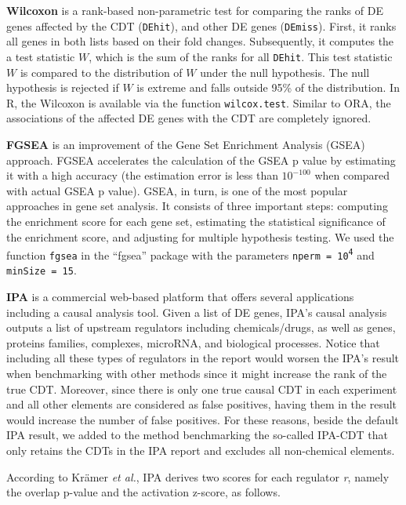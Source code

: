 \textbf{Wilcoxon} is a rank-based non-parametric test for comparing the ranks of DE genes affected by the CDT (\texttt{DEhit}), and other DE genes (\texttt{DEmiss}). First, it ranks all genes in both lists based on their fold changes. Subsequently, it computes the a test statistic $W$, which is the sum of the ranks for all \texttt{DEhit}. This test statistic $W$ is compared to the distribution of $W$ under the null hypothesis. The null hypothesis is rejected if $W$ is extreme and falls outside 95\% of the distribution. In R, the Wilcoxon is available via the function \texttt{wilcox.test}.  Similar to ORA, the  associations of the affected DE genes with the CDT are completely ignored.

\textbf{FGSEA} is an improvement of the Gene Set Enrichment Analysis (GSEA) approach. FGSEA accelerates the calculation of the GSEA p value by estimating it with a high accuracy (the estimation error is less than $10^{-100}$ when compared with actual GSEA p value). GSEA, in turn, is one of the most popular approaches in gene set analysis\cite{Subramanian:2005}. It consists of three important steps: computing the enrichment score for each gene set, estimating the statistical significance of the enrichment score, and adjusting for multiple hypothesis testing. We used the function \texttt{fgsea} in the ``fgsea'' package with the parameters \texttt{nperm = 10\textsuperscript{4}} and \texttt{minSize = 15}.

\textbf{IPA} is a commercial web-based platform that offers several applications including a causal analysis tool\cite{kramer2013causal}. Given a list of DE genes, IPA's causal analysis outputs a list of upstream regulators including chemicals/drugs, as well as genes, proteins families, complexes, microRNA, and biological processes.
Notice that including all these types of regulators in the report would worsen the IPA's result when benchmarking with other methods since it might increase the rank of the true CDT. Moreover, since there is only one true causal CDT in each experiment and all other elements are considered as false positives, having them in the result would increase the number of false positives. 
For these reasons, beside the default IPA result, we added to the method benchmarking the so-called IPA-CDT  that only retains the CDTs in the IPA report and excludes all non-chemical elements.

According to Kr\"{a}mer \textit{et al.}, IPA derives two scores for each regulator \textit{r}, namely the overlap p-value and the activation z-score, as follows.

